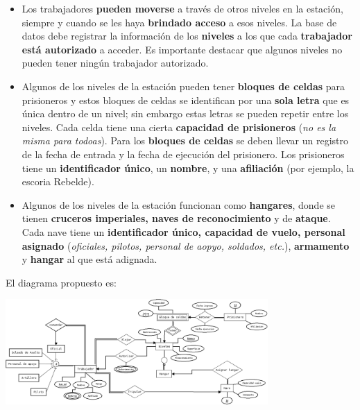 \documentclass{article}
\begin{document}
\begin{enumerate}[label = (\alph*)]
{\begin{itemize}
{                    \textbf{nivel restringido o no}. Todos los niveles tienen 
                    \textbf{viviendas} con capacidad de alojar a varios 
                    trabajadores, y a todos los trabajadores se les asignan 
                    viviendas de la estación.
                }
                \item {
                    Los trabajadores \textbf{pueden moverse} a través de otros 
                    niveles en la estación, siempre y cuando se les haya 
                    \textbf{brindado acceso} a esos niveles. La base de datos 
                    debe registrar la información de los \textbf{niveles} a los 
                    que cada \textbf{trabajador está autorizado} a acceder. Es 
                    importante destacar que algunos niveles no pueden tener 
                    ningún trabajador autorizado.
                }
                \item {
                    Algunos de los niveles de la estación pueden tener 
                    \textbf{bloques de celdas} para prisioneros y estos bloques
                    de celdas se identifican por una \textbf{sola letra} que es 
                    única dentro de un nivel; sin embargo estas letras se pueden
                    repetir entre los niveles. Cada celda tiene una cierta 
                    \textbf{capacidad de prisioneros} (\textit{no es la misma 
                    para todoas}). Para los \textbf{bloques de celdas} se deben
                    llevar un registro de la fecha de entrada y la fecha de 
                    ejecución del prisionero. Los prisioneros tiene un 
                    \textbf{identificador único}, un \textbf{nombre}, y una 
                    \textbf{afiliación} (por ejemplo, la escoria Rebelde).
                }
                \item {
                    Algunos de los niveles de la estación funcionan como 
                    \textbf{hangares}, donde se tienen \textbf{cruceros 
                    imperiales, naves de reconocimiento} y de \textbf{ataque}.
                    Cada nave tiene un \textbf{identificador único, capacidad de
                    vuelo, personal asignado} (\textit{oficiales, pilotos, 
                    personal de aopyo, soldados, etc.}), \textbf{armamento} y 
                    \textbf{hangar} al que está adignada.
                }
            \end{itemize}
            El diagrama propuesto es:
            \begin{center}
                \includegraphics[width=0.75\textwidth]{estrella-er.png}
            \end{center}  
        }
    \end{enumerate}
\end{document}
